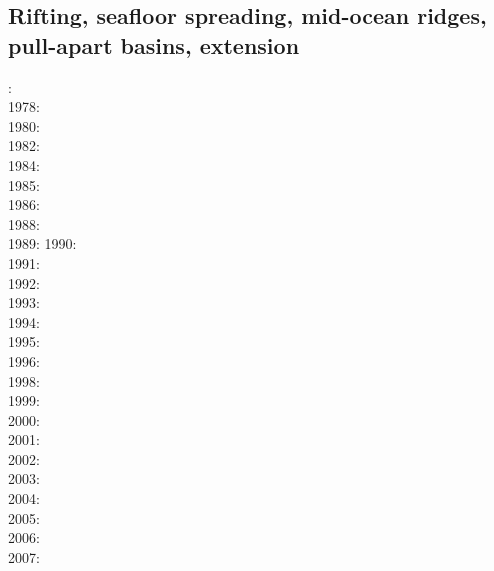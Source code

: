 \subsection{Rifting, seafloor spreading, mid-ocean ridges, pull-apart basins, extension}

{\scriptsize
{}: \cite{froi73}\\
1978: \cite{stei78}\\
1980: \cite{bran80}\\
1982: \cite{bekb82}\\
1984: \cite{poay84}\\
1985: \cite{bosw85}\\
1986: \cite{hoen86b}\cite{zupf86}\cite{zupa86}\cite{mofr86}\\
1988: \cite{bums88}\\
1989: \cite{mewi89}\cite{brbe89}\cite{ismb89}\cite{soen89}\cite{brbe89b}\cite{brbe89c}
1990: \cite{fara90}\cite{lipa90}\cite{mccl90}\\
1991: \cite{trbr91}\cite{buck91}\\
1992: \cite{zieg92b}\cite{egan92}\\
1993: \cite{gowo93}\\
1994: \cite{trca94}\cite{jhpp94}\\
1995: \cite{gowo95}\cite{katl95}\\
1996: \cite{dusa96}\cite{beda96}\cite{mada96}\\
1998: \cite{rafm98}\\
1999: \cite{brun99}\cite{bulp99}\cite{gowo99}\\
2000: \cite{scth00}\\
2001: \cite{hupc01}\cite{hupc01b}\cite{frbr01}\cite{frnb01a}\cite{frnb01b}\\
2002: \cite{hube02}\cite{hani02}\cite{dabm02}\cite{vacl02}\cite{belz02}\cite{hupc02}
      \cite{hube02b}\\
2003: \cite{hube03}\cite{hani03}\cite{covb03}\cite{wibm03}\\
2004: \cite{hier04}\cite{sees04}\\
2005: \cite{hubb05}\cite{coub05}\cite{vanw05}\cite{vabl05}\\
2006: \cite{tibs06}\cite{coma06}\cite{crwy06}\cite{peso06}\\
2007: \cite{huha07}\cite{macl07}\cite{vabl07}\cite{dyrm07}\cite{hube07}\cite{buto07}\cite{socb07}\\
}
